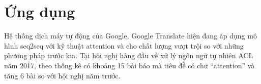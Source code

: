 \section{Ứng dụng}

Hệ thống dịch máy tự động của Google, Google Translate hiện đang áp dụng mô hình seq2seq với kỹ thuật attention và cho chất lượng vượt trội so với những phương pháp trước kia. Tại hội nghị hàng đầu về xử lý ngôn ngữ tự nhiên ACL năm 2017, theo thống kê có khoảng 15 bài báo mà tiêu đề có chữ “attention” và tăng 6 bài so với hội nghị năm trước.